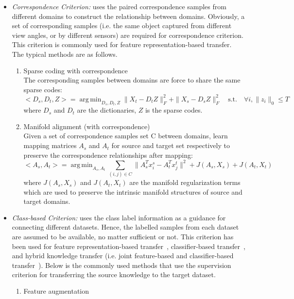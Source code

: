\documentclass[prodmode]{acmsmall}  %
\DeclareMathOperator*{\argmin}{arg\,min}
\begin{document}
\begin{itemize}
\item \textit{Correspondence Criterion:} uses the paired correspondence samples from different domains to construct the relationship between domains. Obviously, a set of corresponding samples (i.e. the same object captured from different view angles, or by different sensors) are required for correspondence criterion. This criterion is commonly used for feature representation-based transfer. The typical methods are as follows.
\begin{enumerate}
\item Sparse coding with correspondence~\cite{Zheng2012}\\
The corresponding samples between domains are force to share the same sparse codes: 
\begin{equation}
<D_s,D_t,Z> = \argmin_{D_s,D_t,Z}\|X_t-D_tZ\|_F^2+\|X_s-D_sZ\|_F^2 \quad \text{s.t.} \quad \forall i,\|z_i\|_0 \leqslant T
\end{equation}
where $D_s$ and $D_t$ are the dictionaries, $Z$ is the sparse codes.
\item Manifold alignment (with correspondence)~\cite{Zhai2010}\\
Given a set of correspondence samples set C between domains, learn mapping matrices $A_s$ and $A_t$ for source and target set respectively to preserve the correspondence relationships after mapping:
\begin{equation}
<A_s,A_t>= \argmin_{A_s,A_t} \sum_{(i,j)\in C}\|A_s^Tx^s_i-A_t^Tx^t_j\|^2+J(A_s,X_s)+J(A_t,X_t)
\end{equation}
where $J(A_s,X_s)$ and $J(A_t,X_t)$ are the manifold regularization terms which are used to preserve the intrinsic manifold structures of source and target domains.
\end{enumerate}
\item \textit{Class-based Criterion:} uses the class label information as a guidance for connecting different datasets. Hence, the labelled samples from each dataset are assumed to be available, no matter sufficient or not.
This criterion has been used for 
feature representation-based transfer~\cite{DaumeIII2007,Saenko2010},
classifier-based transfer~\cite{Yang2007,Ma2014}, 
and hybrid knowledge transfer 
(i.e. joint feature-based and classifier-based transfer~\cite{Hoffman2013}). 
Below is the commonly used methods that use the supervision criterion for transferring the source knowledge to the target dataset.
\begin{enumerate}
\item Feature augmentation~\cite{DaumeIII2007} \\

\end{enumerate}
\end{itemize}
\end{document}
